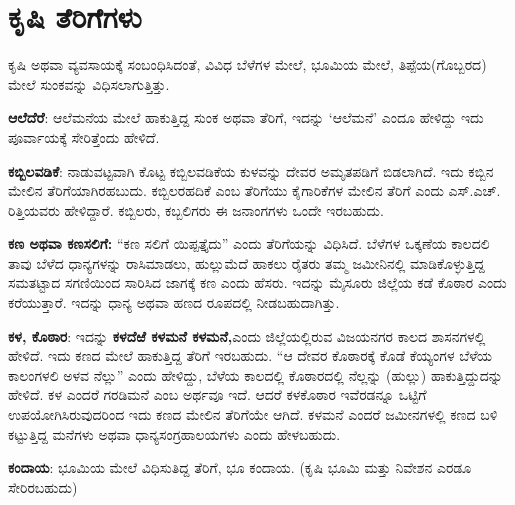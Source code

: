 \vskip 2pt

\section*{ಕೃಷಿ ತೆರಿಗೆಗಳು}

ಕೃಷಿ ಅಥವಾ ವ್ಯವಸಾಯಕ್ಕೆ ಸಂಬಂಧಿಸಿದಂತೆ, ವಿವಿಧ ಬೆಳೆಗಳ ಮೇಲೆ, ಭೂಮಿಯ ಮೇಲೆ, ತಿಪ್ಪೆಯ(ಗೊಬ್ಬರದ) ಮೇಲೆ ಸುಂಕವನ್ನು ವಿಧಿಸಲಾಗುತ್ತಿತ್ತು.

\vskip 2pt

\textbf{ಆಲೆದೆರೆ}: ಆಲೆಮನೆಯ ಮೇಲೆ ಹಾಕುತ್ತಿದ್ದ ಸುಂಕ ಅಥವಾ ತೆರಿಗೆ, ಇದನ್ನು ‘ಆಲೆಮನೆ’ ಎಂದೂ ಹೇಳಿದ್ದು ಇದು ಪೂರ್ವಾಯಕ್ಕೆ ಸೇರಿತ್ತೆಂದು ಹೇಳಿದೆ.

\vskip 2pt

\textbf{ಕಬ್ಬಿಲವಡಿಕೆ}: ನಾಡುವಟ್ಟವಾಗಿ ಕೊಟ್ಟ ಕಬ್ಬಿಲವಡಿಕೆಯ ಕುಳವನ್ನು ದೇವರ ಅಮೃತಪಡಿಗೆ ಬಿಡಲಾಗಿದೆ. ಇದು ಕಬ್ಬಿನ ಮೇಲಿನ ತೆರಿಗೆಯಾಗಿರಹಬುದು. ಕಬ್ಬಿಲರಹದಿಕೆ ಎಂಬ ತೆರಿಗೆಯು ಕೈಗಾರಿಕೆಗಳ ಮೇಲಿನ ತೆರಿಗೆ ಎಂದು ಎಸ್​.ಎಚ್​. ರಿತ್ತಿಯವರು ಹೇಳಿದ್ದಾರೆ. ಕಬ್ಬಿಲರು, ಕಬ್ಬಲಿಗರು ಈ ಜನಾಂಗಗಳು ಒಂದೇ ಇರಬಹುದು.

\vskip 2pt

\textbf{ಕಣ ಅಥವಾ ಕಣಸಲಿಗೆ:} “ಕಣ ಸಲಿಗೆ ಯಿಪ್ಪತ್ತೈದು” ಎಂದು ತೆರಿಗೆಯನ್ನು ವಿಧಿಸಿದೆ. ಬೆಳೆಗಳ ಒಕ್ಕಣೆಯ ಕಾಲದಲಿ ತಾವು ಬೆಳೆದ ಧಾನ್ಯಗಳನ್ನು ರಾಸಿಮಾಡಲು, ಹುಲ್ಲುಮೆದೆ ಹಾಕಲು ರೈತರು ತಮ್ಮ ಜಮೀನಿನಲ್ಲಿ ಮಾಡಿಕೊಳ್ಳುತ್ತಿದ್ದ ಸಮತಟ್ಟಾದ ಸಗಣಿಯಿಂದ ಸಾರಿಸಿದ ಜಾಗಕ್ಕೆ ಕಣ ಎಂದು ಹೆಸರು. ಇದನ್ನು ಮೈಸೂರು ಜಿಲ್ಲೆಯ ಕಡೆ ಕೊಠಾರ ಎಂದು ಕರೆಯುತ್ತಾರೆ. ಇದನ್ನು ಧಾನ್ಯ ಅಥವಾ ಹಣದ ರೂಪದಲ್ಲಿ ನೀಡಬಹುದಾಗಿತ್ತು.

 \textbf{ಕಳ, ಕೊಠಾರ}: ಇದನ್ನು \textbf{ಕಳದೆಱೆ ಕಳಮನೆ ಕಳಮನೆ,}ಎಂದು ಜಿಲ್ಲೆಯಲ್ಲಿರುವ ವಿಜಯನಗರ ಕಾಲದ ಶಾಸನಗಳಲ್ಲಿ ಹೇಳಿದೆ. ಇದು ಕಣದ ಮೇಲೆ ಹಾಕುತ್ತಿದ್ದ ತೆರಿಗೆ ಇರಬಹುದು. “ಆ ದೇವರ ಕೊಠಾರಕ್ಕೆ ಕೊಡೆ ಕೆಯ್ಯಂಗಳ ಬೆಳೆಯ ಕಾಲಂಗಳಲಿ ಅಳವ ನೆಲ್ಲು” ಎಂದು ಹೇಳಿದ್ದು, ಬೆಳೆಯ ಕಾಲದಲ್ಲಿ ಕೊಠಾರದಲ್ಲಿ ನೆಲ್ಲನ್ನು (ಹುಲ್ಲು) ಹಾಕುತ್ತಿದ್ದುದನ್ನು ಹೇಳಿದೆ. ಕಳ ಎಂದರೆ ಗರಡಿಮನೆ ಎಂಬ ಅರ್ಥವೂ ಇದೆ. ಆದರೆ ಕಳಕೊಠಾರ ಇವೆರಡನ್ನೂ ಒಟ್ಟಿಗೆ ಉಪಯೋಗಿಸಿರುವುದರಿಂದ ಇದು ಕಣದ ಮೇಲಿನ ತೆರಿಗೆಯೇ ಆಗಿದೆ. ಕಳಮನೆ ಎಂದರೆ ಜಮೀನಗಳಲ್ಲಿ ಕಣದ ಬಳಿ ಕಟ್ಟುತ್ತಿದ್ದ ಮನೆಗಳು ಅಥವಾ ಧಾನ್ಯಸಂಗ್ರಹಾಲಯಗಳು ಎಂದು ಹೇಳಬಹುದು.

\textbf{ಕಂದಾಯ}: ಭೂಮಿಯ ಮೇಲೆ ವಿಧಿಸುತಿದ್ದ ತೆರಿಗೆ, ಭೂ ಕಂದಾಯ. (ಕೃಷಿ ಭೂಮಿ ಮತ್ತು ನಿವೇಶನ ಎರಡೂ ಸೇರಿರಬಹುದು)

